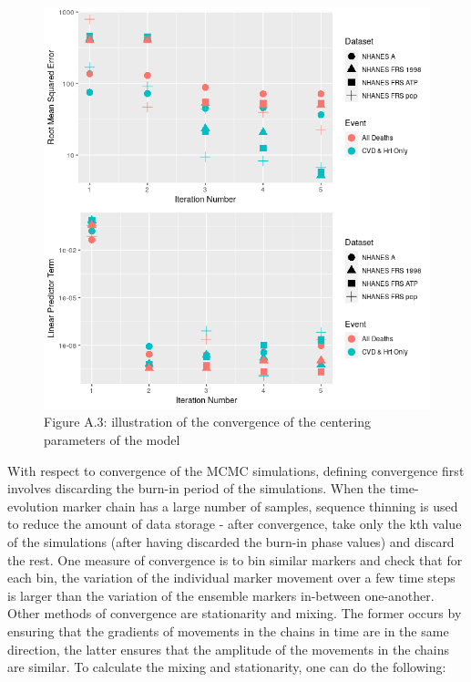 \documentclass[
]{article}
\begin{document}
\begin{figure}
\centering
\includegraphics{../Plots/xhat/RMSE-Linpred_Convergence.png}
\caption{Figure A.3: illustration of the convergence of the centering
parameters of the model}
\end{figure}

With respect to convergence of the MCMC simulations, defining
convergence first involves discarding the burn-in period of the
simulations. When the time-evolution marker chain has a large number of
samples, sequence thinning is used to reduce the amount of data storage
- after convergence, take only the kth value of the simulations (after
having discarded the burn-in phase values) and discard the rest. One
measure of convergence is to bin similar markers and check that for each
bin, the variation of the individual marker movement over a few time
steps is larger than the variation of the ensemble markers in-between
one-another. Other methods of convergence are stationarity and mixing.
The former occurs by ensuring that the gradients of movements in the
chains in time are in the same direction, the latter ensures that the
amplitude of the movements in the chains are similar. To calculate the
mixing and stationarity, one can do the following:
\end{document}
